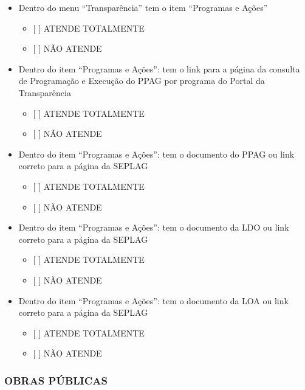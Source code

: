 \documentclass[]{book}
\providecommand{\tightlist}{%
  \setlength{\itemsep}{0pt}\setlength{\parskip}{0pt}}
\begin{document}
\begin{itemize}
\tightlist
\item
  Dentro do menu ``Transparência'' tem o item ``Programas e Ações''

  \begin{itemize}
  \tightlist
  \item
    {[} {]} ATENDE TOTALMENTE
  \item
    {[} {]} NÃO ATENDE
  \end{itemize}
\item
  Dentro do item ``Programas e Ações'': tem o link para a página da consulta de Programação e Execução do PPAG por programa do Portal da Transparência

  \begin{itemize}
  \tightlist
  \item
    {[} {]} ATENDE TOTALMENTE
  \item
    {[} {]} NÃO ATENDE
  \end{itemize}
\item
  Dentro do item ``Programas e Ações'': tem o documento do PPAG ou link correto para a página da SEPLAG

  \begin{itemize}
  \tightlist
  \item
    {[} {]} ATENDE TOTALMENTE
  \item
    {[} {]} NÃO ATENDE
  \end{itemize}
\item
  Dentro do item ``Programas e Ações'': tem o documento da LDO ou link correto para a página da SEPLAG

  \begin{itemize}
  \tightlist
  \item
    {[} {]} ATENDE TOTALMENTE
  \item
    {[} {]} NÃO ATENDE
  \end{itemize}
\item
  Dentro do item ``Programas e Ações'': tem o documento da LOA ou link correto para a página da SEPLAG

  \begin{itemize}
  \tightlist
  \item
    {[} {]} ATENDE TOTALMENTE
  \item
    {[} {]} NÃO ATENDE
  \end{itemize}
\end{itemize}

\hypertarget{obras-puxfablicas-1}{%
\subsubsection*{OBRAS PÚBLICAS}\label{obras-puxfablicas-1}}
\end{document}
